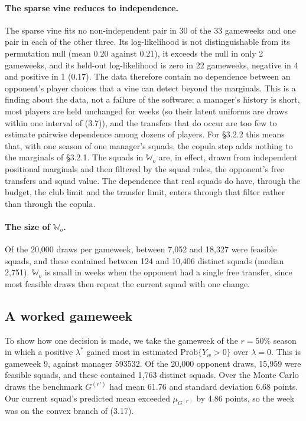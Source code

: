 \paragraph{The sparse vine reduces to independence.} The sparse vine fits no non-independent
pair in 30 of the 33 gameweeks and one pair in each of the other three. Its log-likelihood is
not distinguishable from its permutation null (mean 0.20 against 0.21), it exceeds the null in
only 2 gameweeks, and its held-out log-likelihood is zero in 22 gameweeks, negative in 4 and
positive in 1 (0.17). The data therefore contain no dependence between an opponent's player
choices that a vine can detect beyond the marginals. This is a finding about the data, not a
failure of the software: a manager's history is short, most players are held unchanged for
weeks (so their latent uniforms are draws within one interval of (3.7)), and the transfers that
do occur are too few to estimate pairwise dependence among dozens of players. For §3.2.2 this
means that, with one season of one manager's squads, the copula step adds nothing to the
marginals of §3.2.1. The squads in $\mathbb{W}_o$ are, in effect, drawn from independent
positional marginals and then filtered by the squad rules, the opponent's free transfers and
squad value. The dependence that real squads do have, through the budget, the club limit and
the transfer limit, enters through that filter rather than through the copula.

\paragraph{The size of $\mathbb{W}_o$.} Of the 20{,}000 draws per gameweek, between 7{,}052 and
18{,}327 were feasible squads, and these contained between 124 and 10{,}406 distinct squads
(median 2{,}751). $\mathbb{W}_o$ is small in weeks when the opponent had a single free transfer,
since most feasible draws then repeat the current squad with one change.

\subsection{A worked gameweek}
\label{sec:s2-worked}

To show how one decision is made, we take the gameweek of the $r=50\%$ season in which a
positive $\lambda^*$ gained most in estimated $\mathrm{Prob}\{Y_w>0\}$ over $\lambda=0$. This is
gameweek 9, against manager 593532. Of the 20{,}000 opponent draws, 15{,}959 were feasible
squads, and these contained 1{,}763 distinct squads. Over the Monte Carlo draws the benchmark
$G^{(r')}$ had mean 61.76 and standard deviation 6.68 points. Our current squad's predicted
mean exceeded $\mu_{G^{(r')}}$ by 4.86 points, so the week was on the convex branch of (3.17).


